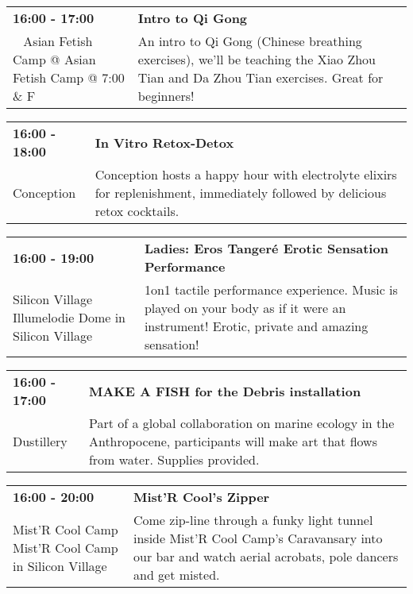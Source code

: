 \begin{tabular}{ p{1in} p{2.2in} }
    \textbf{16:00 - 17:00} & \textbf{Intro to Qi Gong} \\
    ~ \newline Asian Fetish Camp @ Asian Fetish Camp @ 7:00 \& F & An intro to Qi Gong (Chinese breathing exercises), we'll be teaching the Xiao Zhou Tian and Da Zhou Tian exercises. Great for beginners! \\
    \hline 
\end{tabular}
    
\begin{tabular}{ p{1in} p{2.2in} }
    \textbf{16:00 - 18:00} & \textbf{In Vitro Retox-Detox} \\
    Conception \newline  & Conception hosts a happy hour with electrolyte elixirs for replenishment, immediately followed by delicious retox cocktails. \\
    \hline 
\end{tabular}
    
\begin{tabular}{ p{1in} p{2.2in} }
    \textbf{16:00 - 19:00} & \textbf{Ladies: Eros Tanger\'e Erotic Sensation Performance} \\
    Silicon Village \newline Illumelodie Dome in Silicon Village & 1on1 tactile performance experience. Music is played on your body as if it were an instrument! Erotic, private and amazing sensation! \\
    \hline 
\end{tabular}
    
\begin{tabular}{ p{1in} p{2.2in} }
    \textbf{16:00 - 17:00} & \textbf{MAKE A FISH for the Debris installation} \\
    Dustillery \newline  & Part of a global collaboration on marine ecology in the Anthropocene, participants will make art that flows from water. 
Supplies provided. \\
    \hline 
\end{tabular}
    
\begin{tabular}{ p{1in} p{2.2in} }
    \textbf{16:00 - 20:00} & \textbf{Mist'R Cool's Zipper} \\
    Mist'R Cool Camp \newline Mist'R Cool Camp in Silicon Village & Come zip-line through a funky light tunnel inside Mist'R Cool Camp's Caravansary into our bar and watch aerial acrobats, pole dancers and get misted. \\
    \hline 
\end{tabular}
    
